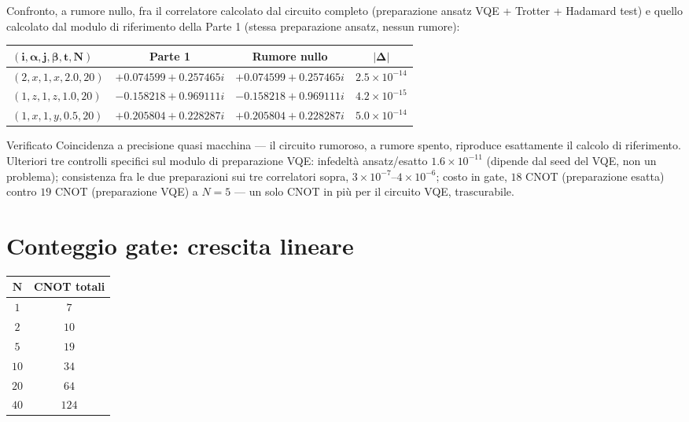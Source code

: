 \documentclass[11pt,a4paper]{article}
\begin{document}
Confronto, a rumore nullo, fra il correlatore calcolato dal circuito
completo (preparazione ansatz VQE + Trotter + Hadamard test) e quello
calcolato dal modulo di riferimento della Parte 1 (stessa preparazione
ansatz, nessun rumore):

\begin{center}
\renewcommand{\arraystretch}{1.25}
\begin{tabular}{@{}lccc@{}}
\toprule
$\boldsymbol{(i,\alpha,j,\beta,t,N)}$ & \textbf{Parte 1} & \textbf{Rumore nullo} & $\boldsymbol{|\Delta|}$\\
\midrule
$(2,x,1,x,2.0,20)$ & $+0.074599+0.257465i$ & $+0.074599+0.257465i$ & $2.5\times10^{-14}$\\
$(1,z,1,z,1.0,20)$ & $-0.158218+0.969111i$ & $-0.158218+0.969111i$ & $4.2\times10^{-15}$\\
$(1,x,1,y,0.5,20)$ & $+0.205804+0.228287i$ & $+0.205804+0.228287i$ & $5.0\times10^{-14}$\\
\bottomrule
\end{tabular}
\end{center}

\begin{okbox}{Verificato}
Coincidenza a precisione quasi macchina --- il circuito rumoroso, a
rumore spento, riproduce esattamente il calcolo di riferimento. Ulteriori
tre controlli specifici sul modulo di preparazione VQE: infedeltà
ansatz/esatto $1.6\times10^{-11}$ (dipende dal seed del VQE, non un
problema); consistenza fra le due preparazioni sui tre correlatori
sopra, $3\times10^{-7}$--$4\times10^{-6}$; costo in gate, $18$ CNOT
(preparazione esatta) contro $19$ CNOT (preparazione VQE) a $N=5$ ---
un solo CNOT in più per il circuito VQE, trascurabile.
\end{okbox}

\section{Conteggio gate: crescita lineare}

\begin{center}
\renewcommand{\arraystretch}{1.2}
\begin{tabular}{@{}cc@{}}
\toprule
$\boldsymbol{N}$ & \textbf{CNOT totali}\\
\midrule
$1$ & $7$\\
$2$ & $10$\\
$5$ & $19$\\
$10$ & $34$\\
$20$ & $64$\\
$40$ & $124$\\
\bottomrule
\end{tabular}
\end{center}
\end{document}
